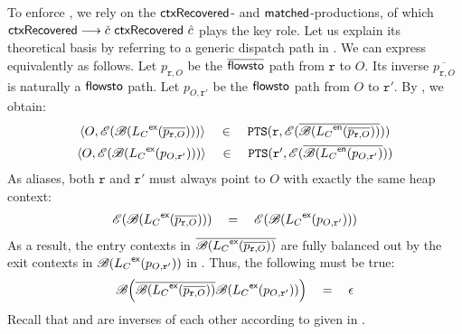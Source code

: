 
To enforce \dispatchconTwo, we rely on the $\textsf{ctxRecovered}$- and $\textsf{matched}$-productions, of which $\ctxrecovered \linebreak \longrightarrow \check{{c}} ~ \ctxrecovered ~ \hat{{c}}$ plays the key
role. Let us explain its theoretical basis by referring to 
a generic  dispatch path  in . We can express \dispatchconTwo
equivalently as follows.
Let $p_{\mathtt{r},O}$ be the $\overline{\textsf{flowsto}}$ path from $\mathtt{r}$ to $O$. Its inverse $\overline{p_{\mathtt{r},O}}$ is 
naturally a
$\textsf{flowsto}$ path. Let $p_{O,\mathtt{r}'}$ be the $\textsf{flowsto}$ path
from $O$ to $\mathtt{r}'$.  By 
,
we obtain:
\begin{eqnarray}
\label{eq:DP-C2-ptr}
\begin{tabular}{c}
$\langle O,\RawCtxCheck{\BalParen{\LC^\exit(\overline{p_{\mathtt{r},O}})}}\rangle$  \quad $\in$  \quad
$\pointsto(\mathtt{r}, \RawCtxHat{\overline{\BalParen{\LC^\entry(\overline{p_{\mathtt{r},O}})}}}
)$\\[1ex]
$\langle O,\RawCtxCheck{\BalParen{\LC^\exit(p_{O,\mathtt{r}'})}}\rangle$  
\quad $\in$  \quad
$\pointsto(\mathtt{r}', \RawCtxHat{\overline{\BalParen{\LC^\entry(p_{O,\mathtt{r}'}}}}
)$
\end{tabular}
\end{eqnarray}
As aliases, both $\mathtt{r}$ and $\mathtt{r}'$ must always  point to $O$ with exactly the same heap context:
\begin{eqnarray}
\begin{tabular}{c}
$\RawCtxCheck{\BalParen{\LC^\exit(\overline{p_{\mathtt{r},O}})}} \quad=\quad \RawCtxCheck{\BalParen{\LC^\exit(p_{O,\mathtt{r}'})}}$
\end{tabular}
\end{eqnarray}
As a result, the entry contexts in 
$\overline{\mbox{$\mathscr{B}(\mbox{${L}_C$}^\textsf{ex}(\overline{p_{\mathtt{r},O}}))$}}$ are
fully balanced out by the exit contexts 
in $ {\mbox{$\mathscr{B}(\mbox{${L}_C$}^\textsf{ex}(p_{O,\mathtt{r}'}))$}} $  in \LC. Thus, the following 
must be true:
\begin{eqnarray}
\label{eq:pt-ctxobj-LC}
\begin{tabular}{c}
$\BalParenBig{\overline{\BalParen{\LC^\exit(\overline{p_{\mathtt{r},O}})}}  {\BalParen{\LC^\exit(p_{O,\mathtt{r}'})}}} \quad = \quad \epsilon$
\end{tabular}
\end{eqnarray}
Recall that \gramexit and \gramentry are inverses of each other according to
\LC given in .

